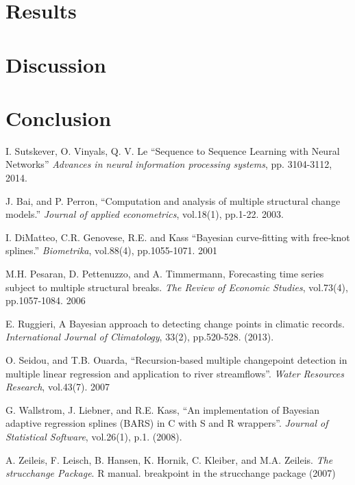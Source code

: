 \documentclass[12pt]{article}
\begin{document}
\section{Results}


\section{Discussion}


\section{Conclusion}



\begin{thebibliography}{9}
I. Sutskever, O. Vinyals, Q. V. Le ``Sequence to Sequence Learning with Neural Networks”  \textit{Advances in neural information processing systems}, pp. 3104-3112, 2014. 

J. Bai, and P. Perron, ``Computation and analysis of multiple structural change models.”  \textit{Journal of applied econometrics}, vol.18(1), pp.1-22. 2003.

I. DiMatteo, C.R. Genovese, R.E. and Kass ``Bayesian curve‐fitting with free‐knot splines.” \textit{Biometrika}, vol.88(4), pp.1055-1071. 2001

M.H. Pesaran, D. Pettenuzzo, and A. Timmermann, Forecasting time series subject to multiple structural breaks. \textit{The Review of Economic Studies}, vol.73(4), pp.1057-1084. 2006

E. Ruggieri, A Bayesian approach to detecting change points in climatic records. \textit{International Journal of Climatology}, 33(2), pp.520-528. (2013).

O. Seidou,  and T.B. Ouarda, ``Recursion‐based multiple changepoint detection in multiple linear regression and application to river streamflows”. \textit{Water Resources Research}, vol.43(7). 2007

G. Wallstrom, J. Liebner, and R.E. Kass, ``An implementation of Bayesian adaptive regression splines (BARS) in C with S and R wrappers”. \textit{Journal of Statistical Software}, vol.26(1), p.1. (2008).

A. Zeileis, F. Leisch, B. Hansen, K. Hornik, C. Kleiber, and M.A. Zeileis. \textit{The strucchange Package}. R manual. breakpoint in the strucchange package (2007)


\end{thebibliography}
\end{document}
